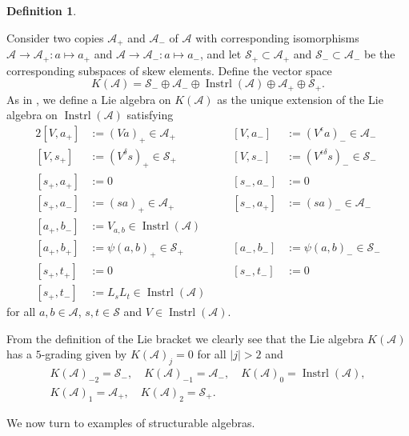 \documentclass[oneside,a4paper]{amsart} %
\theoremstyle{definition}
\newtheorem{definition}[theorem]{Definition}
\DeclareMathOperator{\Inst}{Instrl}
\newcommand{\A}{\mathcal{A}}
\renewcommand{\SS}{\mathcal{S}}
\numberwithin{equation}{section}
\begin{document}
\begin{definition}\label{def:Lie alg}

Consider two copies $\A_+$ and $\A_-$ of $\A$ with corresponding isomorphisms $\A \to \A_+ \colon a \mapsto a_+$
and $\A \to \A_- \colon a \mapsto a_-$, and let $\SS_+\subset \A_+$ and $\SS_-\subset \A_-$ be the corresponding subspaces of skew elements.
Define the vector space
\[K(\A)=\SS_-\oplus \A_-\oplus \Inst(\A) \oplus \A_+ \oplus \SS_+.\]
As in \cite[\S 3]{Allison1979}, we define a Lie algebra on $K(\A)$ as the unique extension of the Lie algebra on $\Inst(\A)$ satisfying
\begin{alignat*}{2}
    [V, a_+] &:= (Va)_+ \in \A_+ & [V, a_-] &:= (V^\epsilon a)_-\in\A_- \\
    [V, s_+] &:= (V^\delta s)_+\in \SS_+ & [V, s_-] &:= (V^{\epsilon\delta} s)_-\in \SS_- \\[2ex]
    [s_+,a_+] &:= 0 & [s_-,a_-] &:= 0 \\
    [s_+,a_-] &:= (sa)_+\in \A_+ & [s_-,a_+] &:= (sa)_-\in \A_- \\[2ex]
    [a_+,b_-] &:= V_{a,b}\in \Inst(\A) \qquad \\
    [a_+,b_+] &:= \psi(a,b)_+\in \SS_+ &[a_-,b_-] &:= \psi(a,b)_-\in \SS_- \\[2ex]
    [s_+,t_+]&:=0 & [s_-,t_-]&:=0 \\
    [s_+,t_-]&:=L_{s}L_{t}\in \Inst(\A)
\end{alignat*}
for all $a,b \in \A$, $s,t \in \SS$ and $V \in \Inst(\A)$.
\end{definition}

From the definition of the Lie bracket we clearly see that the Lie algebra $K(\A)$ has a $5$-grading given by $K(\A)_j=0$ for all $|j|>2$ and 
\begin{multline*}
	K(\A)_{-2}=\SS_-,\quad K(\A)_{-1}=\A_-,\quad K(\A)_{0}=\Inst(\A),\\
		K(\A)_{1}=\A_+,\quad K(\A)_{2}=\SS_+.
\end{multline*}

We now turn to examples of structurable algebras.
\end{document}
